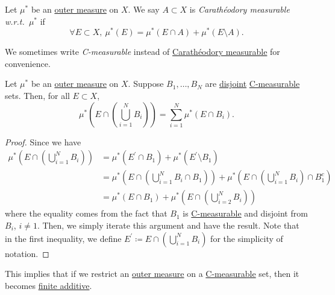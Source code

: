\begin{definition}\label{def:C-measurable}
	Let \(\mu^{\ast} \) be an \hyperref[def:outer-measure]{outer measure} on \(X\). We say \(A\subset X\) is \emph{Carathéodory measurable w.r.t.\ \(\mu^{\ast} \)} if
	\[
		\forall E\subset X,\ \mu^{\ast} (E) = \mu^{\ast} \left(E\cap A\right) + \mu^{\ast} \left(E\setminus A\right).
	\]
\end{definition}
\begin{note}
	We sometimes write \emph{C-measurable} instead of \hyperref[def:C-measurable]{Carathéodory measurable} for convenience.
\end{note}
\begin{lemma}\label{lma:disjoint-C-measurable-finite-additive}
	Let \(\mu^{\ast} \) be an \hyperref[def:outer-measure]{outer measure} on \(X\). Suppose \(B_1, \dots , B_N \) are \underline{disjoint} \hyperref[def:C-measurable]{C-measurable} sets. Then, for all \(E\subset X\),
	\[
		\mu^{\ast} \left(E\cap \left(\bigcup_{i=1}^{N} B_{i}\right)\right) = \sum_{i=1}^{N} \mu^{\ast} \left(E\cap B_i\right).
	\]
\end{lemma}
\begin{proof}
	Since we have
	\[
		\begin{split}
			\mu^{\ast} \left(E\cap \left(\bigcup_{i=1}^{N} B_{i}\right)\right)
			 & = \mu^{\ast} \left( E^\prime  \cap B_1\right) + \mu^{\ast} \left(E ^\prime \setminus B_1\right)                                                               \\
			 & = \mu^{\ast} \left(E\cap \left(\bigcup_{i=1}^{N} B_{i}\cap B_1\right)\right) + \mu^{\ast} \left(E\cap \left(\bigcup_{i=1}^{N} B_{i}\right)\cap B^{c}_1\right) \\
			 & = \mu^{\ast} (E\cap B_1) + \mu^{\ast} \left(E\cap \left(\bigcup_{i=2}^{N} B_{i}\right)\right)
		\end{split}
	\]
	where the equality comes from the fact that \(B_1 \) is \hyperref[def:C-measurable]{C-measurable} and disjoint from \(B_{i}\), \(i\neq 1\). Then, we simply iterate this argument and have the result. Note that in the first inequality, we define \(E ^\prime\coloneqq E\cap \left(\bigcup_{i=1}^{N} B_{i}\right)\) for the simplicity of notation.
\end{proof}
\begin{remark}
	This implies that if we restrict an \hyperref[def:outer-measure]{outer measure} on a \hyperref[def:C-measurable]{C-measurable} set, then it becomes \underline{finite additive}.
\end{remark}

